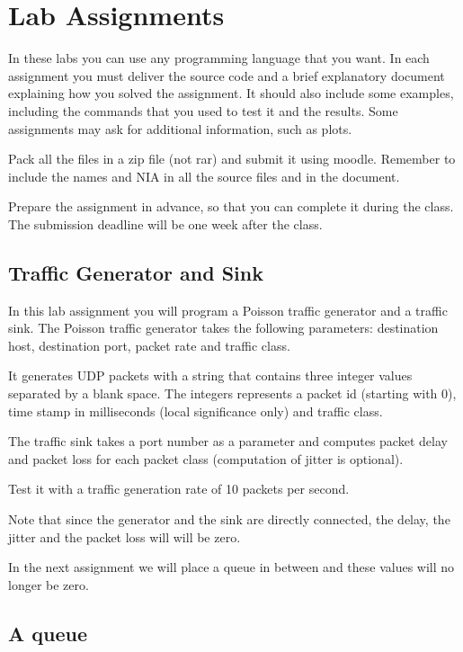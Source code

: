 \chapter{Lab Assignments}

In these labs you can use any programming language that you want. 
In each assignment you must deliver the source code and a brief explanatory document explaining how you solved the assignment.
It should also include some examples, including the commands that you used to test it and the results.
Some assignments may ask for additional information, such as plots.

Pack all the files in a zip file (not rar) and submit it using moodle.
Remember to include the names and NIA in all the source files and in the document.

Prepare the assignment in advance, so that you can complete it during the class.
The submission deadline will be one week after the class.

\section{Traffic Generator and Sink}

In this lab assignment you will program a Poisson traffic generator and a traffic sink.
The Poisson traffic generator takes the following parameters:
destination host, destination port, packet rate and traffic class.

It generates UDP packets with a string that contains three integer values separated by a blank space. The integers represents a packet id (starting with 0), time stamp in milliseconds (local significance only) and traffic class.

The traffic sink takes a port number as a parameter and computes packet delay and packet loss for each packet class (computation of jitter is optional).

Test it with a traffic generation rate of 10 packets per second.

Note that since the generator and the sink are directly connected, the delay, the jitter and the packet loss will will be zero.

In the next assignment we will place a queue in between and these values will no longer be zero.

\section{A queue}

